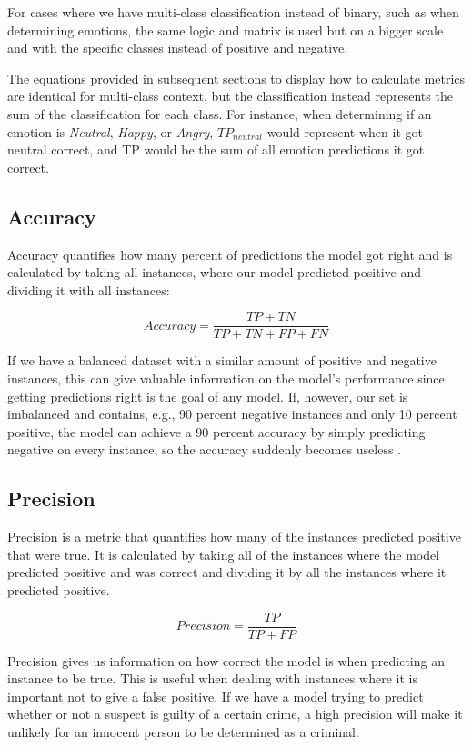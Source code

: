 \documentclass[nofilelist]{cslthse-msc}
\begin{document}
For cases where we have multi-class classification instead of binary, such as when determining emotions, the same logic and matrix is used but on a bigger scale and with the specific classes instead of positive and negative. 

The equations provided in subsequent sections to display how to calculate metrics are identical for multi-class context, but the classification instead represents the sum of the classification for each class. For instance, when determining if an emotion is \textit{Neutral}, \textit{Happy}, or \textit{Angry}, $TP_{neutral}$ would represent when it got neutral correct, and TP would be the sum of all emotion predictions it got correct.  









\subsection{Accuracy}
Accuracy quantifies how many percent of predictions the model got right and is calculated by taking all instances, where our model predicted positive and dividing it with all instances:

$$ Accuracy = \frac{TP + TN}{TP + TN + FP + FN}$$

If we have a balanced dataset with a similar amount of positive and negative instances, this can give valuable information on the model's performance since getting predictions right is the goal of any model. If, however, our set is imbalanced and contains, e.g., 90 percent negative instances and only 10 percent positive, the model can achieve a 90 percent accuracy by simply predicting negative on every instance, so the accuracy suddenly becomes useless \citep{imbalancedlearning}. 

\subsection{Precision}
Precision is a metric that quantifies how many of the instances predicted positive that were true. It is calculated by taking all of the instances where the model predicted positive and was correct and dividing it by all the instances where it predicted positive.

$$ Precision = \frac{TP}{TP + FP}$$

Precision gives us information on how correct the model is when predicting an instance to be true. This is useful when dealing with instances where it is important not to give a false positive. If we have a model trying to predict whether or not a suspect is guilty of a certain crime, a high precision will make it unlikely for an innocent person to be determined as a criminal. 
\end{document}
